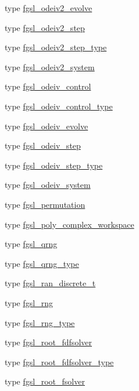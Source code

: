\begin{DoxyCompactItemize}
\item 
type \hyperlink{structfgsl_1_1fgsl__odeiv2__evolve}{fgsl\-\_\-odeiv2\-\_\-evolve}
\item 
type \hyperlink{structfgsl_1_1fgsl__odeiv2__step}{fgsl\-\_\-odeiv2\-\_\-step}
\item 
type \hyperlink{structfgsl_1_1fgsl__odeiv2__step__type}{fgsl\-\_\-odeiv2\-\_\-step\-\_\-type}
\item 
type \hyperlink{structfgsl_1_1fgsl__odeiv2__system}{fgsl\-\_\-odeiv2\-\_\-system}
\item 
type \hyperlink{structfgsl_1_1fgsl__odeiv__control}{fgsl\-\_\-odeiv\-\_\-control}
\item 
type \hyperlink{structfgsl_1_1fgsl__odeiv__control__type}{fgsl\-\_\-odeiv\-\_\-control\-\_\-type}
\item 
type \hyperlink{structfgsl_1_1fgsl__odeiv__evolve}{fgsl\-\_\-odeiv\-\_\-evolve}
\item 
type \hyperlink{structfgsl_1_1fgsl__odeiv__step}{fgsl\-\_\-odeiv\-\_\-step}
\item 
type \hyperlink{structfgsl_1_1fgsl__odeiv__step__type}{fgsl\-\_\-odeiv\-\_\-step\-\_\-type}
\item 
type \hyperlink{structfgsl_1_1fgsl__odeiv__system}{fgsl\-\_\-odeiv\-\_\-system}
\item 
type \hyperlink{structfgsl_1_1fgsl__permutation}{fgsl\-\_\-permutation}
\item 
type \hyperlink{structfgsl_1_1fgsl__poly__complex__workspace}{fgsl\-\_\-poly\-\_\-complex\-\_\-workspace}
\item 
type \hyperlink{structfgsl_1_1fgsl__qrng}{fgsl\-\_\-qrng}
\item 
type \hyperlink{structfgsl_1_1fgsl__qrng__type}{fgsl\-\_\-qrng\-\_\-type}
\item 
type \hyperlink{structfgsl_1_1fgsl__ran__discrete__t}{fgsl\-\_\-ran\-\_\-discrete\-\_\-t}
\item 
type \hyperlink{structfgsl_1_1fgsl__rng}{fgsl\-\_\-rng}
\item 
type \hyperlink{structfgsl_1_1fgsl__rng__type}{fgsl\-\_\-rng\-\_\-type}
\item 
type \hyperlink{structfgsl_1_1fgsl__root__fdfsolver}{fgsl\-\_\-root\-\_\-fdfsolver}
\item 
type \hyperlink{structfgsl_1_1fgsl__root__fdfsolver__type}{fgsl\-\_\-root\-\_\-fdfsolver\-\_\-type}
\item 
type \hyperlink{structfgsl_1_1fgsl__root__fsolver}{fgsl\-\_\-root\-\_\-fsolver}
\item 

\end{DoxyCompactItemize}
